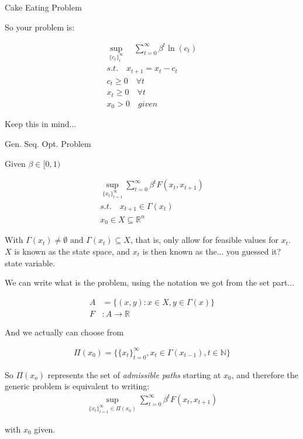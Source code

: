 \documentclass[aspectratio=169]{beamer}
\begin{document}
\begin{frame}{Cake Eating Problem}
    
    So your problem is:
    
    \begin{align*}
        \sup_{\{c_t\}_t^\infty}\quad \sum_{t=0}^\infty \beta^t \ln(c_t)\\
        s.t. \quad x_{t+1} = x_t - c_t\\
        c_t \geq 0 \quad \forall t\\
        x_t \geq 0 \quad \forall t\\
        x_0 > 0 \quad given
    \end{align*}
    
    Keep this in mind...
    
\end{frame}

\begin{frame}{Gen. Seq. Opt. Problem}

Given $\beta\in[0,1)$

\begin{align*}
    \sup_{\{x_t\}_{t=1}^\infty} \sum_{t=0}^\infty \beta^t F(x_t,x_{t+1})\\
    s.t. \quad x_{t+1} \in \Gamma(x_t)\\
    x_0 \in X \subseteq \mathds{R}^n
\end{align*}
    
    With $\Gamma(x_t)\neq \emptyset$ and  $\Gamma(x_t)\subseteq X$, that is, only allow for feasible values for $x_t$. $X$ is known as the state space, and $x_t$ is then known as the... \pause you guessed it? \pause state variable.
    
\end{frame}

\begin{frame}

We can write what is the problem, using the notation we got from the set part...

\begin{align*}
    A& = \{(x,y) : x\in X, y \in \Gamma(x) \}\\
    F&: A \rightarrow \mathds{R}
\end{align*}

And we actually can choose from

\begin{align*}
    \Pi(x_0) = \{\{x_t\}_{t=0}^\infty , x_t \in \Gamma(x_{t-1}) , t \in \mathds{N} \}
\end{align*}

So $\Pi(x_o)$ represents the set of \emph{admissible paths} starting at $x_0$, and therefore the generic problem is equivalent to writing:
\begin{align*}
    \sup_{\{x_t\}_{t=1}^\infty\in\Pi(x_0)} \sum_{t=0}^\infty \beta^t F(x_t,x_{t+1})
\end{align*}

with $x_0$ given.

\end{frame}
\end{document}
